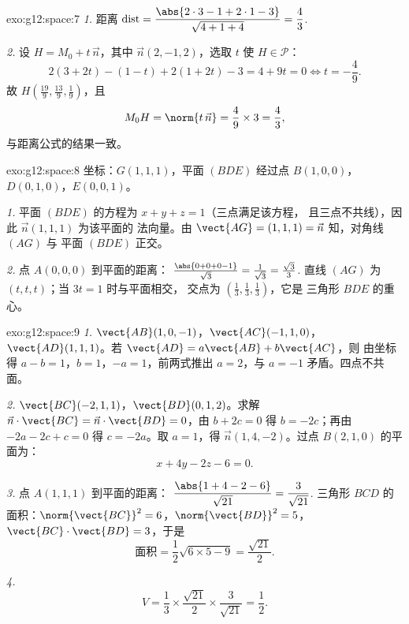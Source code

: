 \begin{solution}{exo:g12:space:7}
\emph{1.} 距离 $\operatorname{dist} = \dfrac{\abs{2\cdot3 - 1 + 2\cdot1 - 3}}
{\sqrt{4 + 1 + 4}} = \dfrac{4}{3}$.

\emph{2.} 设 $H = M_0 + t\,\vec n$，其中 $\vec n(2, -1, 2)$，选取 $t$
使 $H \in \mathcal P$：
\[
2(3 + 2t) - (1 - t) + 2(1 + 2t) - 3 = 4 + 9t = 0 \iff t = -\frac49 .
\]
故 $H\left(\frac{19}{9}, \frac{13}{9}, \frac19\right)$，且
\[
M_0H = \norm{t\,\vec n} = \frac49 \times 3 = \frac43,
\]
与距离公式的结果一致。
\end{solution}

\begin{solution}{exo:g12:space:8}
坐标：$G(1,1,1)$，平面 $(BDE)$ 经过点 $B(1,0,0)$，
$D(0,1,0)$，$E(0,0,1)$。

\emph{1.} 平面 $(BDE)$ 的方程为 $x + y + z = 1$（三点满足该方程，
且三点不共线），因此 $\vec n(1,1,1)$ 为该平面的
法向量。由 $\vect{AG} = (1,1,1) = \vec n$ 知，对角线 $(AG)$ 与
平面 $(BDE)$ 正交。

\emph{2.} 点 $A(0,0,0)$ 到平面的距离：
$\frac{\abs{0 + 0 + 0 - 1}}{\sqrt3} = \frac{1}{\sqrt3} = \frac{\sqrt3}{3}$.
直线 $(AG)$ 为 $(t, t, t)$；当 $3t = 1$ 时与平面相交，
交点为 $\left(\frac13, \frac13, \frac13\right)$，它是
三角形 $BDE$ 的重心。
\end{solution}

\begin{solution}{exo:g12:space:9}
\emph{1.} $\vect{AB}(1, 0, -1)$，$\vect{AC}(-1, 1, 0)$，
$\vect{AD}(1, 1, 1)$。若 $\vect{AD} = a\vect{AB} + b\vect{AC}$，则
由坐标得 $a - b = 1$，$b = 1$，$-a = 1$，前两式推出
$a = 2$，与 $a = -1$ 矛盾。四点不共面。

\emph{2.} $\vect{BC}(-2, 1, 1)$，$\vect{BD}(0, 1, 2)$。求解
$\vec n \cdot \vect{BC} = \vec n \cdot \vect{BD} = 0$，由
$b + 2c = 0$ 得 $b = -2c$；再由 $-2a - 2c + c = 0$ 得 $c = -2a$。取
$a = 1$，得 $\vec n(1, 4, -2)$。过点 $B(2,1,0)$ 的平面为：
\[
x + 4y - 2z - 6 = 0 .
\]

\emph{3.} 点 $A(1,1,1)$ 到平面的距离：
$\dfrac{\abs{1 + 4 - 2 - 6}}{\sqrt{21}} = \dfrac{3}{\sqrt{21}}$.
三角形 $BCD$ 的面积：$\norm{\vect{BC}}^2 = 6$，$\norm{\vect{BD}}^2 = 5$，
$\vect{BC}\cdot\vect{BD} = 3$，于是
\[
\text{面积} = \frac12\sqrt{6 \times 5 - 9} = \frac{\sqrt{21}}{2}.
\]

\emph{4.}
\[
V = \frac13 \times \frac{\sqrt{21}}{2} \times \frac{3}{\sqrt{21}}
= \frac12 .
\]
\end{solution}

